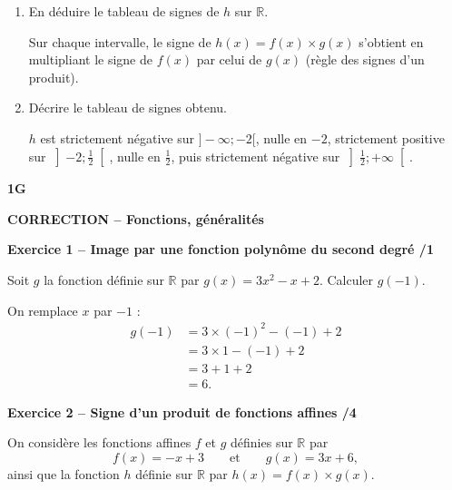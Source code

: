 \documentclass[10pt,a4paper]{article}
\renewcommand{\niveau}{1G}
\renewcommand{\chapitre}{Fonctions, généralités}
\renewcommand{\interroversion}[1]{
    \noindent\textbf{\niveau}

    \vspace{-0.5cm}
    \begin{center}
        \textbf{\large CORRECTION -- \chapitre}
    \end{center}

    \vspace{0.1cm}
}
\begin{document}
\begin{enumerate}
\item En déduire le tableau de signes de \(h\) sur \(\mathbb{R}\).

Sur chaque intervalle, le signe de \(h(x)=f(x)\times g(x)\) s'obtient en multipliant le signe de \(f(x)\) par celui de \(g(x)\) (règle des signes d'un produit).

\begin{center}
\end{center}

\item Décrire le tableau de signes obtenu.

\(h\) est strictement négative sur \(]-\infty;-2[\), nulle en \(-2\), strictement positive sur \(\left]-2;\frac{1}{2}\right[\), nulle en \(\frac{1}{2}\), puis strictement négative sur \(\left]\frac{1}{2};+\infty\right[\).
\end{enumerate}

\newpage


\interroversion{D}

\textbf{Exercice 1 -- Image par une fonction polynôme du second degré \hfill /1}

Soit \(g\) la fonction définie sur \(\mathbb{R}\) par \(g(x)=3x^2-x+2\). Calculer \(g(-1)\).

On remplace \(x\) par \(-1\) :
\[
\begin{aligned}
g(-1) &= 3\times(-1)^2-(-1)+2\\
      &= 3\times1-(-1)+2\\
      &= 3+1+2\\
      &= 6.
\end{aligned}
\]

\textbf{Exercice 2 -- Signe d'un produit de fonctions affines \hfill /4}

On considère les fonctions affines \(f\) et \(g\) définies sur \(\mathbb{R}\) par
\[
f(x)=-x+3 \qquad\text{et}\qquad g(x)=3x+6,
\]
ainsi que la fonction \(h\) définie sur \(\mathbb{R}\) par \(h(x)=f(x)\times g(x)\).
\end{document}
